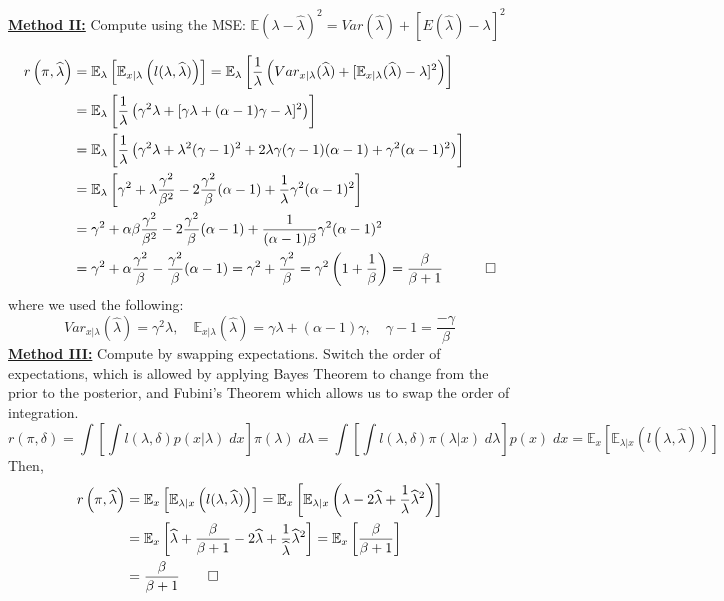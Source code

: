 \documentclass[11pt]{report}
\begin{document}
\underline{\textbf{Method II:}} Compute using the MSE: $\mathbb{E}(\lambda-\widehat{\lambda})^2 = Var(\widehat{\lambda}) + [E(\widehat{\lambda}) -\lambda]^2$ 

\begin{align*}
r\left(\pi, \widehat{\lambda}\right)
& = \mathbb{E}_\lambda\left[\mathbb{E}_{x|\lambda}\left(l(\lambda, \widehat{\lambda})\right) \right] 
= \mathbb{E}_\lambda\left[\frac{1}{\lambda}\left(Var_{x|\lambda}(\widehat{\lambda}) + [\mathbb{E}_{x|\lambda}(\widehat{\lambda}) -\lambda]^2 \right) \right] \\
& = \mathbb{E}_\lambda\left[\frac{1}{\lambda}\left(\gamma^2\lambda + [\gamma\lambda + (\alpha-1)\gamma-\lambda]^2 \right) \right] \\
& = \mathbb{E}_\lambda\left[\frac{1}{\lambda}\left(\gamma^2\lambda + \lambda^2(\gamma-1)^2 + 2\lambda\gamma(\gamma-1)(\alpha-1) + \gamma^2(\alpha-1)^2 \right) \right] \\
& = \mathbb{E}_\lambda\left[\gamma^2 + \lambda\frac{\gamma^2}{\beta^2} - 2\frac{\gamma^2}{\beta}(\alpha-1) + \frac{1}{\lambda}\gamma^2(\alpha-1)^2  \right] \\ 		
& = \gamma^2 + \alpha\beta\frac{\gamma^2}{\beta^2} - 2\frac{\gamma^2}{\beta}(\alpha-1) + \frac{1}{(\alpha-1)\beta}\gamma^2(\alpha-1)^2 \\   
& = \gamma^2 + \alpha\frac{\gamma^2}{\beta} - \frac{\gamma^2}{\beta}(\alpha-1)   		
= \gamma^2  + \frac{\gamma^2}{\beta}   		
= \gamma^2\left(1  + \frac{1}{\beta}\right)   	
= \frac{\beta}{\beta+1} \quad \qed 
\end{align*}
where we used the following:
$$Var_{x|\lambda}(\widehat{\lambda}) = \gamma^2\lambda, \quad  \mathbb{E}_{x|\lambda}(\widehat{\lambda}) = \gamma\lambda +(\alpha-1)\gamma, \quad \gamma-1 = \frac{-\gamma}{\beta} $$
\underline{\textbf{Method III:}} Compute by swapping expectations. \newline
Switch the order of expectations, which is allowed by applying Bayes Theorem to change from the prior to the posterior, and Fubini's Theorem which allows us to swap the order of integration.   
$$r(\pi, \delta) =  \int\left[ \int l(\lambda,\delta)p(x|\lambda) \;dx\right] \pi(\lambda)\; d\lambda = \int\left[ \int l(\lambda,\delta)\pi(\lambda|x) \;d\lambda\right] p(x)\; dx =  \mathbb{E}_x\left[\mathbb{E}_{\lambda|x}\left(l(\lambda, \widehat{\lambda})\right) \right]$$
Then, 
\begin{align*}
r\left(\pi, \widehat{\lambda}\right)
& = \mathbb{E}_x\left[\mathbb{E}_{\lambda|x}\left(l(\lambda, \widehat{\lambda})\right) \right] 
= \mathbb{E}_x\left[\mathbb{E}_{\lambda|x}\left(\lambda - 2\widehat{\lambda} + \frac{1}{\lambda}\widehat{\lambda}^2 \right) \right] \\
& = \mathbb{E}_x\left[\widehat{\lambda} + \frac{\beta}{\beta+1} - 2\widehat{\lambda} + \frac{1}{\widehat{\lambda}}\widehat{\lambda}^2  \right] 
= \mathbb{E}_x\left[\frac{\beta}{\beta+1}  \right] \\
& = \frac{\beta}{\beta+1}  \qed
\end{align*}
\end{document}
